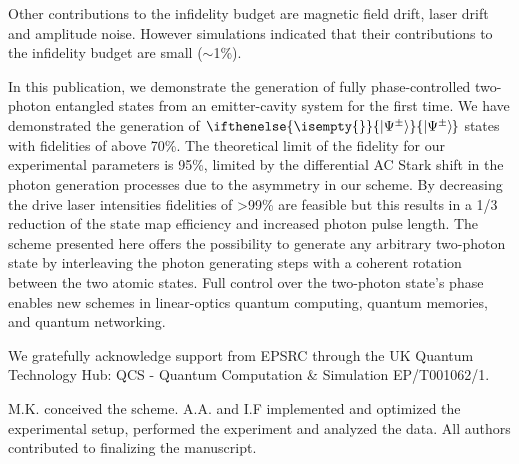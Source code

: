 \documentclass[aps,prl,twocolumn,floatfix,superscriptaddress]{revtex4-2}
\newcommand{\ket}[2][]{
	\ifthenelse{\isempty{#1}}
	{\ensuremath{\xspace\left\vert #2 \right\rangle\xspace}}
	{\ensuremath{\xspace\left\vert #2 \right\rangle_{\! #1}\xspace}}
	}
\begin{document}
Other contributions to the infidelity budget are magnetic field drift, laser drift and amplitude noise. However simulations indicated that their contributions to the infidelity budget are small ($\sim$1\%).


In this publication, we demonstrate the generation of fully phase-controlled two-photon entangled states from an emitter-cavity system for the first time. We have demonstrated the generation of $\ket{\Psi^\pm}$ states with fidelities of above 70\%. The theoretical limit of the fidelity for our experimental parameters is 95\%, limited by the differential AC Stark shift in the photon generation processes due to the asymmetry in our scheme. By decreasing the drive laser intensities fidelities of >99\% are feasible but this results in a 1/3 reduction of the state map efficiency and increased photon pulse length.
The scheme presented here offers the possibility to generate any arbitrary two-photon state by  interleaving the photon generating steps with a coherent rotation between the two atomic states.
Full control over the two-photon state's phase enables new schemes in linear-optics quantum computing, quantum memories, and quantum networking.


\begin{acknowledgments}
We gratefully acknowledge support from EPSRC through the UK Quantum Technology Hub: QCS - Quantum Computation \& Simulation EP/T001062/1.\\
\end{acknowledgments}

M.K. conceived the scheme. A.A. and I.F implemented and optimized the experimental setup, performed the experiment and analyzed the data. All authors contributed to finalizing the manuscript.


{}
\end{document}
